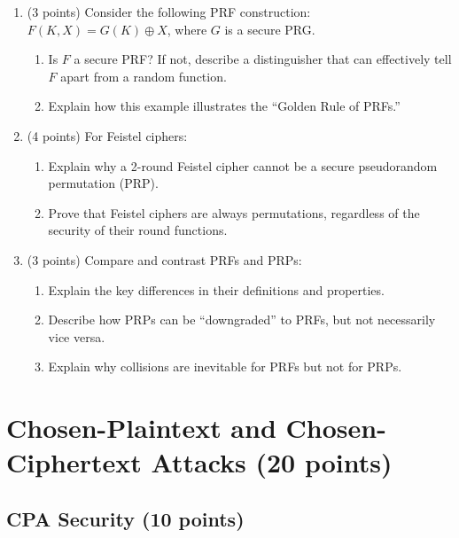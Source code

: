 \documentclass[10pt,a4paper,american]{exam}
\begin{document}
\begin{enumerate}
	\item (3 points) Consider the following PRF construction: $F(K, X) = G(K) \oplus X$, where $G$ is a secure PRG.
	      \begin{enumerate}
		      \item Is $F$ a secure PRF? If not, describe a distinguisher that can effectively tell $F$ apart from a random function.
		      \item Explain how this example illustrates the ``Golden Rule of PRFs.''
	      \end{enumerate}

	\item (4 points) For Feistel ciphers:
	      \begin{enumerate}
		      \item Explain why a 2-round Feistel cipher cannot be a secure pseudorandom permutation (PRP).
		      \item Prove that Feistel ciphers are always permutations, regardless of the security of their round functions.
	      \end{enumerate}

	\item (3 points) Compare and contrast PRFs and PRPs:
	      \begin{enumerate}
		      \item Explain the key differences in their definitions and properties.
		      \item Describe how PRPs can be ``downgraded'' to PRFs, but not necessarily vice versa.
		      \item Explain why collisions are inevitable for PRFs but not for PRPs.
	      \end{enumerate}
\end{enumerate}

\section{Chosen-Plaintext and Chosen-Ciphertext Attacks (20 points)}

\subsection{CPA Security (10 points)}
\end{document}
